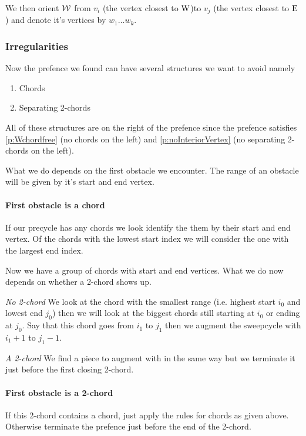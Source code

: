     We then orient $\mathcal{W}$ from $v_i$ (the vertex closest to $\mathrm{W}$)to $v_j$ (the vertex closest to $\mathrm{E}$) and denote it's vertices by $w_1 \ldots w_k$.


    \subsubsection{Irregularities}
      Now the prefence we found can have several structures we want to avoid
      namely
      \begin{enumerate}
        \itemsep=-4pt
        \item Chords
        \item Separating 2-chords
      \end{enumerate}

      All of these structures are on the right of the prefence since the prefence satisfies \ref{p:Wchordfree} (no chords on the left) and \ref{p:noInteriorVertex} (no separating 2-chords on the left).

      What we do depends on the first obstacle we encounter. The range of an obstacle will be given by it's start and end vertex.

      \paragraph{First obstacle is a chord}
      If our precycle has any chords we look identify the them by their start and end vertex. Of the chords with the lowest start index we will consider the one with the largest end index.

      Now we have a group of chords with start and end vertices. What we do now depends on whether a 2-chord shows up.

      \emph{No 2-chord}
      We look at the chord with the smallest range (i.e. highest start $i_0$ and lowest end $j_0$) then we will look at the biggest chords still starting at $i_0$ or ending at $j_0$. Say that this chord goes from $i_1$ to $j_1$ then we augment the sweepcycle with $i_1 +1$ to $j_1 -1$.

      \emph{A 2-chord}
      We find a piece to augment with in the same way  but we terminate it just before the first closing 2-chord.

      \paragraph{First obstacle is a 2-chord}
      If this 2-chord contains a chord, just apply the rules for chords as given above. Otherwise terminate the prefence just before the end of the 2-chord.



